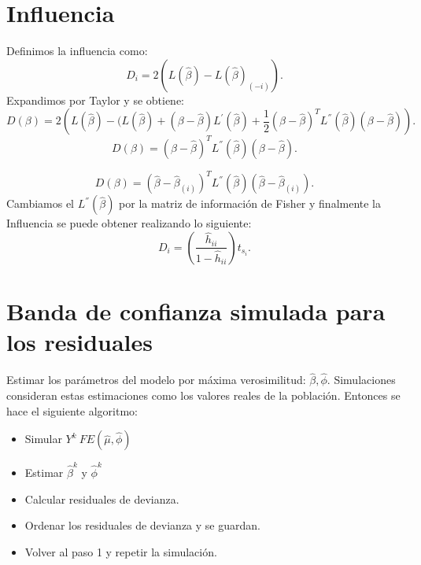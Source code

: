 \documentclass{article}
\begin{document}
\section{Influencia}
Definimos la influencia como:
\[ D_{i}=2{(L{(\hat{\beta})}-L{(\hat{\beta})_{(-i)}})}.\]
Expandimos por Taylor y se obtiene:
\[ D{(\beta)}=2{(L{(\hat{\beta})}-{(L{(\hat{\beta})}+(\beta-\hat{\beta})L^{'}{(\hat{\beta})+\frac{1}{2}{(\beta-\hat{\beta})}^{T}L^{''}{(\hat{\beta})}{(\beta-\hat{\beta})}}})}.\]
\[ D{(\beta)}={(\beta-\hat{\beta})}^{T}L^{''}{(\hat{\beta})}{(\beta-\hat{\beta})}.\]

\[ D{(\beta)}={(\hat{\beta}-\hat{\beta}_{{(i)}})}^{T}L^{''}{(\hat{\beta})}{(\hat{\beta}-\hat{\beta}_{{(i)}})}.\]
Cambiamos el $L^{''}{(\hat{\beta})}$ por la matriz de información de Fisher y finalmente la Influencia se puede obtener realizando lo siguiente:
\[ D_{i}={(\frac{\hat{h}_{ii}}{1-\hat{h}_{ii}})}t_{s_{i}}.\]

\section{Banda de confianza simulada para los residuales}
Estimar los parámetros del modelo por máxima verosimilitud: $\hat{\beta},\hat{\phi}$. Simulaciones consideran estas estimaciones como los valores reales de la población. Entonces se hace el siguiente algoritmo:
\begin{itemize}
	\item Simular $Y^{k}~FE{(\hat{\mu},\hat{\phi})}$
	\item Estimar $\hat{\beta}^{k}$ y $\hat{\phi}^{k}$
	\item Calcular residuales de devianza.
	\item Ordenar los residuales de devianza y se guardan.
	\item Volver al paso 1 y repetir la simulación.
\end{itemize}
\end{document}
